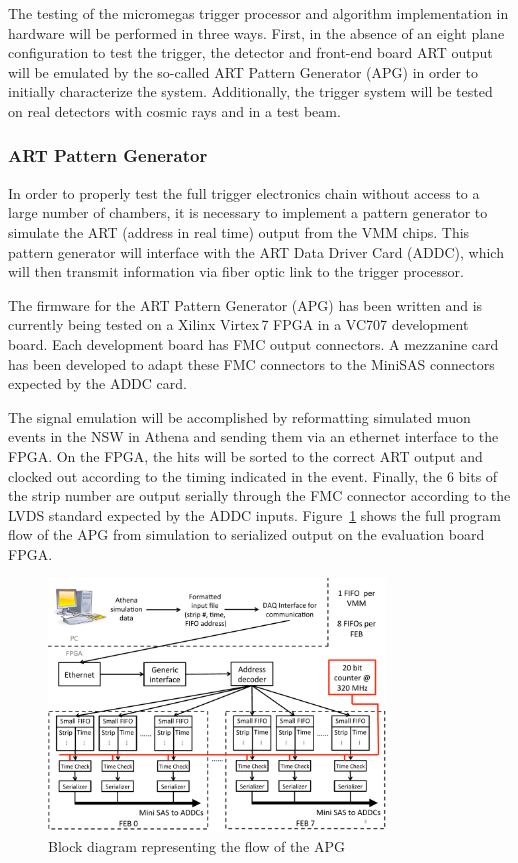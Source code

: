 
The testing of the micromegas trigger processor and algorithm
implementation in hardware will be performed in three ways. First, in
the absence of an eight plane configuration to test the trigger, the
detector and front-end board ART output will be emulated by the
so-called  ART Pattern Generator (APG)
in order to initially characterize the system. Additionally, the trigger
system will be tested on real detectors with cosmic rays and in a
test beam.

\subsubsection{ART Pattern Generator}

In order to properly test the full trigger electronics chain without
access to a large number of chambers, it is necessary to implement a
pattern generator  to simulate the ART (address in real time) output
from  the VMM chips. This pattern generator will interface with the
ART  Data Driver Card (ADDC), which will then transmit information via
fiber optic link to the trigger processor.

The firmware for the ART Pattern Generator (APG) has been written and
is currently being tested on a Xilinx
Virtex\,7 FPGA in a VC707 development board. Each development board has
FMC output connectors. A mezzanine
card has been developed to adapt these FMC connectors to the MiniSAS
connectors expected by the ADDC card.

The signal emulation will be accomplished by reformatting simulated
muon events in the NSW in Athena and sending them via an ethernet
interface to the FPGA. On the FPGA, the hits will be sorted to the
correct ART output and clocked out according to the timing indicated
in the event. Finally, the 6 bits of the strip number are output
serially through the FMC connector according to the LVDS standard
expected by the ADDC inputs. Figure~\ref{fig:APGBlockDiag} shows the
full program flow of the APG from simulation to serialized output on
the evaluation board FPGA.

\begin{figure}[h]
 \begin{center}
 \includegraphics[width=0.8\textwidth]{figures/APGBlockDiagramFinal}
 \caption{Block diagram representing the flow of the APG}
 \label{fig:APGBlockDiag}
 \end{center}
 \end{figure}

